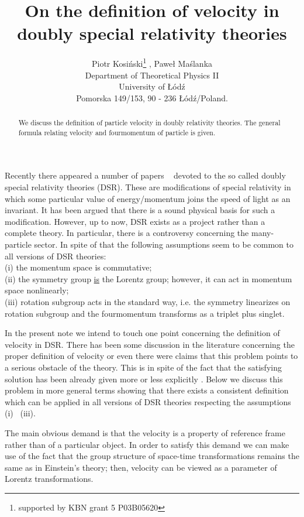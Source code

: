 \documentclass[a4paper,12pt]{article}
\title{On the definition of velocity in doubly special relativity theories }
\author{Piotr Kosi\'nski\thanks{supported by KBN grant 5 P03B05620} , 
 Pawe{\l} Ma\'slanka\myHighlight{$^*$}\coordHE{} \\
Department of Theoretical Physics II \\
University of {\L}\'od\'z \\
Pomorska 149/153, 90 - 236 {\L}\'od\'z/Poland.}
\date{}
\begin{document}
\maketitle
\begin{abstract}
We discuss the definition of particle velocity in doubly relativity theories. The general formula relating
velocity and fourmomentum of particle is given.
\end{abstract}

\newpage

Recently there appeared a number of papers \cite{b1} \myHighlight{$\div $}\coordHE{}\ \cite{b20} devoted to the so called doubly special relativity
theories (DSR). These are modifications of special relativity in which some particular value of energy/momentum
joins the speed of light as an invariant. It has been argued that there is a sound physical basis for such a modification.
However, up to now, DSR exists as a project rather than a complete theory. In particular, there is a controversy concerning 
the many-particle sector. In spite of that the following assumptions seem to be common to all versions of DSR theories:\\
(i) the momentum space is commutative; \\
(ii) the symmetry group \underline{is} the Lorentz group; 
 however, it can act in momentum space nonlinearly; \\
(iii)  rotation subgroup acts in the standard way, i.e. the symmetry linearizes on rotation subgroup and the fourmomentum 
transforms as a triplet plus singlet.

In the present note we intend to touch one point concerning the definition of velocity in DSR. There has been some
 discussion in the literature concerning the proper definition of velocity \cite{b19} or even there were claims
\cite{b21} that this problem points to a serious obstacle of the theory. This is in spite of the fact that the
satisfying solution has been already given more or less explicitly \cite{b6} \cite{b15}. Below we discuss this problem
in more general terms showing that there exists a consistent definition which can be applied in all versions
of DSR theories respecting the assumptions (i) \myHighlight{$\div$}\coordHE{}\ (iii).

The main obvious demand is that the velocity is a property of reference frame rather than of a particular object.
In order to satisfy this demand we can make use of the fact that the group structure of space-time transformations
remains the same as in Einstein's theory; then, velocity can be viewed as a parameter of Lorentz transformations.
\end{document}
